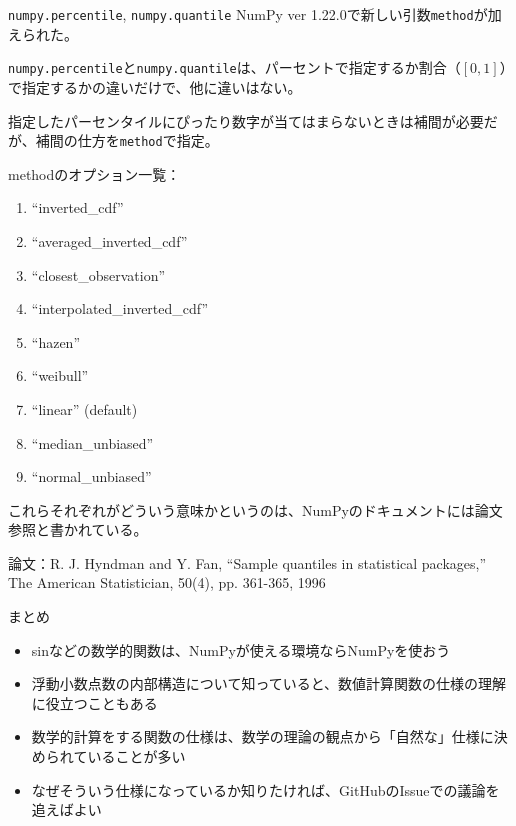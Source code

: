 \documentclass[unicode,lualatex,aspectratio=169]{beamer}
\begin{document}
\begin{frame}[fragile]{{\tt numpy.percentile}, {\tt numpy.quantile}}
  NumPy ver 1.22.0で新しい引数\verb|method|が加えられた。

  {\tt numpy.percentile}と{\tt numpy.quantile}は、パーセントで指定するか割合（$[0,1]$）で指定するかの違いだけで、他に違いはない。

  指定したパーセンタイルにぴったり数字が当てはまらないときは補間が必要だが、補間の仕方を\verb|method|で指定。
\end{frame}
\begin{frame}[fragile]
  methodのオプション一覧：
  {\tiny
  \begin{enumerate}
  \item ``inverted\_cdf''
  \item ``averaged\_inverted\_cdf''
  \item ``closest\_observation''
  \item ``interpolated\_inverted\_cdf''
  \item ``hazen''
  \item ``weibull''
  \item ``linear'' (default)
  \item ``median\_unbiased''
  \item ``normal\_unbiased''
  \end{enumerate}
  }
  これらそれぞれがどういう意味かというのは、NumPyのドキュメントには論文参照と書かれている。

  論文：R. J. Hyndman and Y. Fan, “Sample quantiles in statistical packages,” The American Statistician, 50(4), pp. 361-365, 1996
\end{frame}
\begin{frame}[fragile]{まとめ}
  \begin{itemize}
  \item sinなどの数学的関数は、NumPyが使える環境ならNumPyを使おう
  \item 浮動小数点数の内部構造について知っていると、数値計算関数の仕様の理解に役立つこともある
  \item 数学的計算をする関数の仕様は、数学の理論の観点から「自然な」仕様に決められていることが多い
  \item なぜそういう仕様になっているか知りたければ、GitHubのIssueでの議論を追えばよい
  \end{itemize}
\end{frame}
\end{document}
